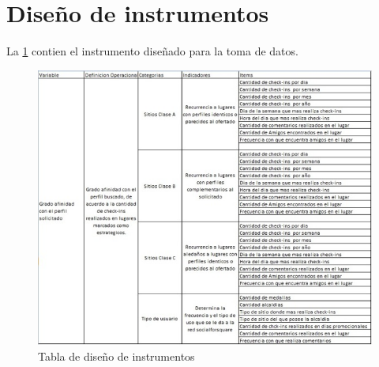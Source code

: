 \section{Dise\~no de instrumentos}
La \ref{fig:instrumentos} contien el instrumento dise\~nado para la toma de datos.
\begin{figure}[h]
\begin{center}
\includegraphics[scale=0.7]{./instrumentos.png}
\end{center}
{\caption{Tabla de dise\~no de instrumentos}\label{fig:instrumentos}}
\end{figure}

\pagebreak